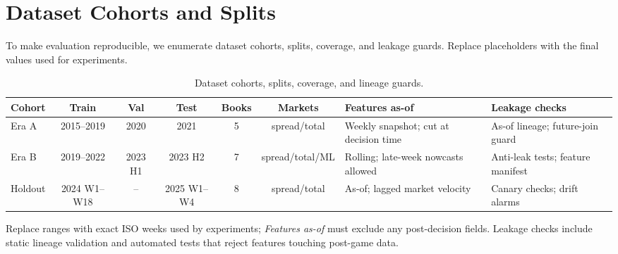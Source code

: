 
\section{Dataset Cohorts and Splits}\label{sec:dataset-table}
To make evaluation reproducible, we enumerate dataset cohorts, splits, coverage, and leakage guards. Replace placeholders with the final values used for experiments.
\begin{table}[t]
  \centering
  \footnotesize
  \begingroup{}\hfuzz=1pt\sloppy
  \begin{threeparttable}
    \caption{Dataset cohorts, splits, coverage, and lineage guards.}
    \label{tab:dataset-cohorts}
    \begingroup
    \setlength{\tabcolsep}{4pt}
    \renewcommand{\arraystretch}{1.15}
    \begin{tabularx}{\linewidth}{@{} l c c c c c >{\RaggedRight\arraybackslash}X >{\RaggedRight\arraybackslash}X @{} }
      \toprule
      \textbf{Cohort} & \textbf{Train} & \textbf{Val} & \textbf{Test} & \textbf{Books} & \textbf{Markets} & \textbf{Features as-of} & \textbf{Leakage checks} \\
      \midrule
      Era A & 2015--2019 & 2020 & 2021 & 5 & spread/total & Weekly snapshot; cut at decision time & As-of lineage; future-join guard \\
      Era B & 2019--2022 & 2023 H1 & 2023 H2 & 7 & spread/total/ML & Rolling; late-week nowcasts allowed & Anti-leak tests; feature manifest \\
      Holdout & 2024 W1--W18 & -- & 2025 W1--W4 & 8 & spread/total & As-of; lagged market velocity & Canary checks; drift alarms \\
      \bottomrule
    \end{tabularx}
    \endgroup
    \begin{tablenotes}[flushleft]\footnotesize\RaggedRight
      \item Replace ranges with exact ISO weeks used by experiments; \emph{Features as-of} must exclude any post-decision fields. Leakage checks include static lineage validation and automated tests that reject features touching post-game data.
    \end{tablenotes}
  \end{threeparttable}
  \endgroup
\end{table}

